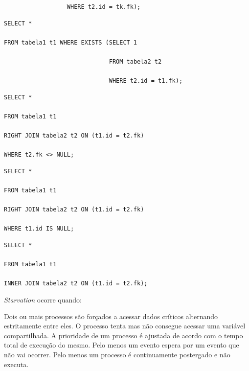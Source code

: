 \documentclass[12pt, addpoints]{exam}
\begin{document}
\begin{questions}
\begin{choices}
\begin{verbatim}
                  WHERE t2.id = tk.fk);

\end{verbatim}


\choice \begin{verbatim}SELECT *

FROM tabela1 t1 WHERE EXISTS (SELECT 1

                              FROM tabela2 t2

                              WHERE t2.id = t1.fk);

\end{verbatim}


\choice \begin{verbatim}SELECT *

FROM tabela1 t1

RIGHT JOIN tabela2 t2 ON (t1.id = t2.fk)

WHERE t2.fk <> NULL;

\end{verbatim}


\choice \begin{verbatim}SELECT *

FROM tabela1 t1

RIGHT JOIN tabela2 t2 ON (t1.id = t2.fk)

WHERE t1.id IS NULL;

\end{verbatim}


\choice \begin{verbatim}SELECT *

FROM tabela1 t1

INNER JOIN tabela2 t2 ON (t1.id = t2.fk);

\end{verbatim}


\end{choices}

\question

\textit{Starvation} ocorre quando:
\begin{choices}
\choice Dois ou mais processos são forçados a acessar dados críticos alternando estritamente entre eles.
\choice O processo tenta mas não consegue acessar uma variável compartilhada.
\choice A prioridade de um processo é ajustada de acordo com o tempo total de execução do mesmo.
\choice Pelo menos um evento espera por um evento que não vai ocorrer.
\choice Pelo menos um processo é continuamente postergado e não executa.
\end{choices}

\question


\end{questions}
\end{document}
